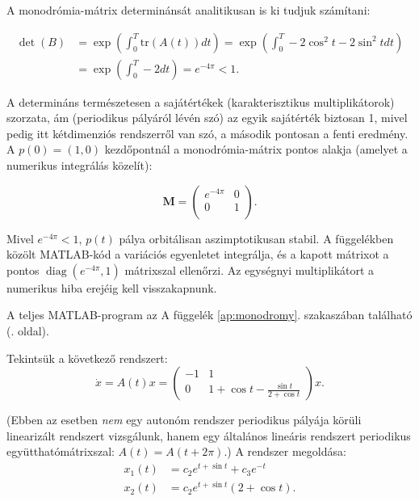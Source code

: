 A monodrómia-mátrix determinánsát analitikusan is ki tudjuk számítani:

\begin{align}
\det(B)&=\exp \left( \int_0^T \mathrm{tr}(A(t)) dt\right)=\exp \left( \int_0^T -2\cos^2t-2\sin^2t dt\right)\\
&=\exp \left( \int_0^T -2 dt\right)=e^{-4\pi}<1.
\end{align}

A determináns természetesen a sajátértékek (karakterisztikus multiplikátorok) szorzata, ám (periodikus pályáról lévén szó) az egyik sajátérték biztosan 1, mivel pedig itt kétdimenziós rendszerről van szó, a második pontosan a fenti eredmény. A $p(0)=(1,0)$ kezdőpontnál a monodrómia-mátrix pontos alakja (amelyet a numerikus integrálás közelít):

\begin{equation}
\mathbf{M}=\begin{pmatrix}
e^{-4\pi} & 0\\ 0 & 1\\
\end{pmatrix}.
\end{equation}

Mivel $e^{-4\pi}<1$, $p(t)$ pálya orbitálisan aszimptotikusan stabil. A függelékben közölt MATLAB-kód a variációs egyenletet integrálja, és a kapott mátrixot a pontos $\operatorname{diag}(e^{-4\pi},1)$ mátrixszal ellenőrzi. Az egységnyi multiplikátort a numerikus hiba erejéig kell visszakapnunk.

\label{use:monodromy}A teljes MATLAB-program az A függelék \ref{ap:monodromy}. szakaszában található (\pageref{ap:monodromy}. oldal).
\exampleend

 Tekintsük a következő rendszert:
\begin{equation}
\dot{x}=A(t)x=\begin{pmatrix}
-1 & 1\\
0 & 1+ \cos t-\frac{\sin t}{2+\cos t}
\end{pmatrix}x.
\end{equation}

(Ebben az esetben \emph{nem} egy autonóm rendszer periodikus pályája körüli linearizált rendszert vizsgálunk, hanem egy általános lineáris rendszert periodikus együtthatómátrixszal: $A(t)=A(t+2\pi)$.) A rendszer megoldása:
\begin{align}
x_1(t)&=c_2 e^{t+\sin t}+c_3 e^{-t}\\
x_2(t)&=c_2e^{t+\sin t}\left( 2+\cos t\right).
\end{align}

